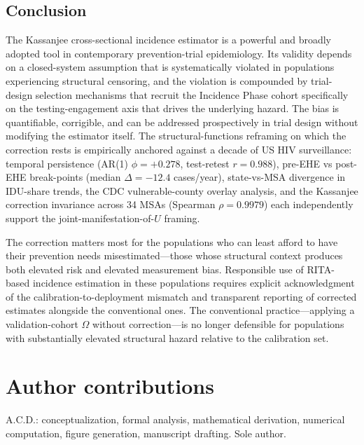 \documentclass[12pt]{article}
\begin{document}
\subsection{Conclusion}

The Kassanjee cross-sectional incidence estimator is a powerful and broadly adopted tool in contemporary prevention-trial epidemiology. Its validity depends on a closed-system assumption that is systematically violated in populations experiencing structural censoring, and the violation is compounded by trial-design selection mechanisms that recruit the Incidence Phase cohort specifically on the testing-engagement axis that drives the underlying hazard. The bias is quantifiable, corrigible, and can be addressed prospectively in trial design without modifying the estimator itself.  The structural-functions reframing on which the correction rests is empirically anchored against a decade of US HIV surveillance: temporal persistence (AR(1) $\phi = +0.278$, test-retest $r = 0.988$), pre-EHE vs post-EHE break-points (median $\Delta = -12.4$ cases/year), state-vs-MSA divergence in IDU-share trends, the CDC vulnerable-county overlay analysis, and the Kassanjee correction invariance across 34 MSAs (Spearman $\rho = 0.9979$) each independently support the joint-manifestation-of-$U$ framing. 

The correction matters most for the populations who can least afford to have their prevention needs misestimated---those whose structural context produces both elevated risk and elevated measurement bias. Responsible use of RITA-based incidence estimation in these populations requires explicit acknowledgment of the calibration-to-deployment mismatch and transparent reporting of corrected estimates alongside the conventional ones. The conventional practice---applying a validation-cohort $\Omega$ without correction---is no longer defensible for populations with substantially elevated structural hazard relative to the calibration set.


\section*{Author contributions}

A.C.D.: conceptualization, formal analysis, mathematical derivation, numerical computation, figure generation, manuscript drafting. Sole author.
\end{document}
